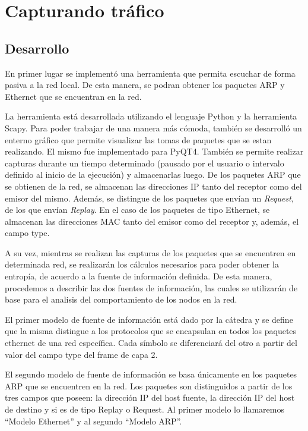 \section{Capturando tráfico}

\subsection{Desarrollo}

En primer lugar se implementó una herramienta que permita escuchar de forma pasiva a la red local. De esta manera, se podran obtener los paquetes ARP y Ethernet que se encuentran en la red. 

La herramienta está desarrollada utilizando el lenguaje Python y la herramienta Scapy. Para poder trabajar de una manera más cómoda, también se desarrolló un enterno gráfico que permite visualizar las tomas de paquetes que se estan realizando. El mismo fue implementado para PyQT4. También se permite realizar capturas durante un tiempo determinado (pausado por el usuario o intervalo definido al inicio de la ejecución) y almacenarlas luego.  
De los paquetes ARP que se obtienen de la red, se almacenan las direcciones IP tanto del receptor como del emisor del mismo. Además, se distingue de los paquetes que envían un \textit{Request}, de los que envían \textit{Replay}. En el caso de los paquetes de tipo Ethernet, se almacenan las direcciones MAC tanto del emisor como del receptor y, además, el campo type.

A su vez, mientras se realizan las capturas de los paquetes que se encuentren en determinada red, se realizarán los cálculos necesarios para poder obtener la entropía, de acuerdo a la fuente de información definida. De esta manera, procedemos a describir las dos fuentes de información, las cuales se utilizarán de base para el analisis del comportamiento de los nodos en la red. 

El primer modelo de fuente de información está dado por la cátedra y se define que la misma distingue a los protocolos que se encapsulan en todos los paquetes ethernet de una red específica. Cada símbolo se diferenciará del otro a partir del valor del campo type del frame de capa 2.

El segundo modelo de fuente de información se basa únicamente en los paquetes ARP que se encuentren en la red. Los paquetes son distinguidos a partir de los tres campos que poseen: la dirección IP del host fuente, la dirección IP del host de destino y si es de tipo Replay o Request. 
Al primer modelo lo llamaremos ``Modelo Ethernet'' y al segundo ``Modelo ARP''.


